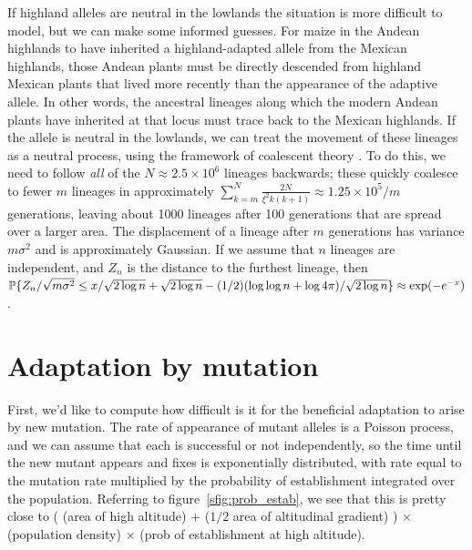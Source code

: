If highland alleles are neutral in the lowlands the situation is more difficult to model, but we can make some informed guesses.
For maize in the Andean highlands to have inherited a highland-adapted allele from the Mexican highlands, those Andean plants must be directly descended from highland Mexican plants that lived more recently than the appearance of the adaptive allele.
In other words, the ancestral lineages along which the modern Andean plants have inherited at that locus must trace back to the Mexican highlands.
If the allele is neutral in the lowlands, we can treat the movement of these lineages as a neutral process, using the framework of coalescent theory \citep{wakeley2005coalescent}.
To do this, we need to follow \emph{all} of the $N \approx 2.5 \times 10^6$ lineages backwards; these quickly coalesce to fewer $m$ lineages in approximately $\sum_{k=m}^N \frac{2N}{\xi^2 k(k+1)} \approx 1.25 \times 10^5/m$ generations, leaving about 1000 lineages after 100 generations that are spread over a larger area.
The displacement of a lineage after $m$ generations has variance $m \sigma^2$ and is approximately Gaussian.
If we assume that $n$ lineages are independent, and $Z_n$ is the distance to the furthest lineage, then $\P\{ Z_n / \sqrt{m \sigma^2} \le x /\sqrt{2 \log n} + \sqrt{2 \log n} - (1/2) (\log \log n + \log 4 \pi)/\sqrt{2 \log n} \} \approx \exp( - e^{-x} )$ \citep{berman1964limit}. 

\section{Adaptation by mutation}


First, we'd like to compute how difficult is it for the beneficial adaptation to arise by new mutation.
The rate of appearance of mutant alleles is a Poisson process,
and we can assume that each is successful or not independently,
so the time until the new mutant appears and fixes is exponentially distributed,
with rate equal to the mutation rate multiplied by the probability of establishment integrated over the population.
Referring to figure~\ref{sfig:prob_estab},
we see that this is pretty close to ( (area of high altitude) $+$ ($1/2$ area of altitudinal gradient) ) $\times$ (population density) $\times$ (prob of establishment at high altitude).

